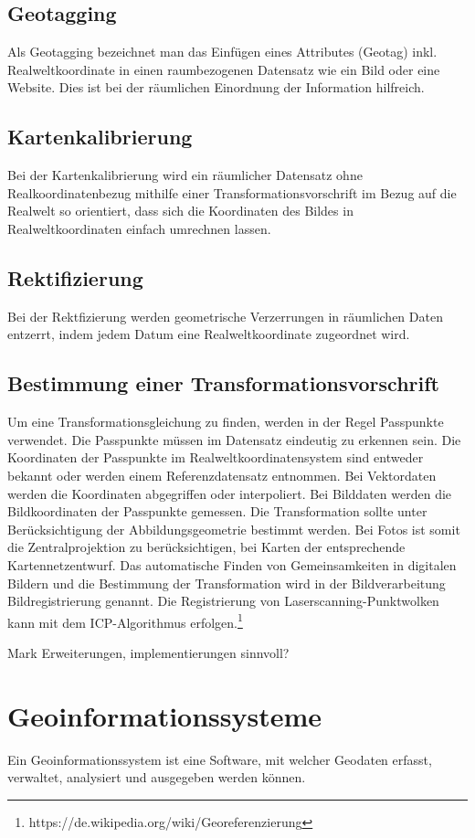 \documentclass[11pt,fleqn]{book} %
\begin{document}
\subsection{Geotagging}
Als Geotagging bezeichnet man das Einfügen eines Attributes (Geotag) inkl. Realweltkoordinate in einen raumbezogenen Datensatz wie ein Bild oder eine Website. Dies ist bei der räumlichen Einordnung der Information hilfreich.
\subsection{Kartenkalibrierung}
Bei der Kartenkalibrierung wird ein räumlicher Datensatz ohne Realkoordinatenbezug mithilfe einer Transformationsvorschrift im Bezug auf die Realwelt so orientiert, dass sich die Koordinaten des Bildes in Realweltkoordinaten einfach umrechnen lassen.
\subsection{Rektifizierung}
Bei der Rektfizierung werden geometrische Verzerrungen in räumlichen Daten entzerrt, indem jedem Datum eine Realweltkoordinate zugeordnet wird.


\subsection{Bestimmung einer Transformationsvorschrift}

Um eine Transformationsgleichung zu finden, werden in der Regel Passpunkte verwendet. Die Passpunkte müssen im Datensatz eindeutig zu erkennen sein. Die Koordinaten der Passpunkte im Realweltkoordinatensystem sind entweder bekannt oder werden einem Referenzdatensatz entnommen. Bei Vektordaten werden die Koordinaten abgegriffen oder interpoliert. Bei Bilddaten werden die Bildkoordinaten der Passpunkte gemessen. Die Transformation sollte unter Berücksichtigung der Abbildungsgeometrie bestimmt werden. Bei Fotos ist somit die Zentralprojektion zu berücksichtigen, bei Karten der entsprechende Kartennetzentwurf. Das automatische Finden von Gemeinsamkeiten in digitalen Bildern und die Bestimmung der Transformation wird in der Bildverarbeitung Bildregistrierung genannt. Die Registrierung von Laserscanning-Punktwolken kann mit dem ICP-Algorithmus erfolgen.\footnote{https://de.wikipedia.org/wiki/Georeferenzierung}

Mark Erweiterungen, implementierungen sinnvoll?

\section{Geoinformationssysteme}
Ein Geoinformationssystem ist eine Software, mit welcher Geodaten erfasst, verwaltet, analysiert und ausgegeben werden können.
\end{document}
